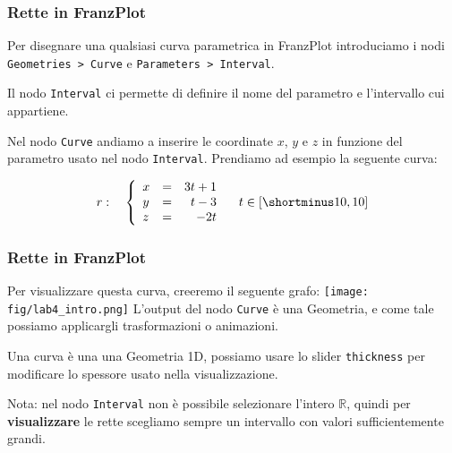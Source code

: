 \documentclass{beamer}
\newcommand{\fig}{./figures} %
\newcommand{\frnzplt}{FranzPlot }
\begin{document}
\begin{frame}
    \frametitle{Rette in \frnzplt}
    Per disegnare una qualsiasi curva parametrica in \frnzplt introduciamo i nodi \texttt{Geometries > Curve} e \texttt{Parameters > Interval}.

    \vspace{0.25cm}
    Il nodo \texttt{Interval} ci permette di definire il nome del parametro e l'intervallo cui appartiene.

    \vspace{0.25cm}
    Nel nodo \texttt{Curve} andiamo a inserire le coordinate $x$, $y$ e $z$ in funzione del parametro usato nel nodo \texttt{Interval}. Prendiamo ad esempio
    la seguente curva:

$$
r: \quad \left\{
\begin{array}{lcr}
x&=&3t+1\\
y&=&t-3\\
z&=&-2t
\end{array}
\right.
    \quad t\in \left[ \shortminus 10, 10 \right]
$$
    \end{frame}
    
\begin{frame}
    \frametitle{Rette in \frnzplt}
    Per visualizzare questa curva, creeremo il seguente grafo:
\texttt{[image: \\fig/lab4\_intro.png]}
    L'output del nodo \texttt{Curve} \`e una Geometria, e come tale possiamo applicargli trasformazioni o animazioni.

    Una curva \`e una una Geometria 1D, possiamo usare lo slider \texttt{thickness} per modificare lo spessore usato nella visualizzazione.

    \vspace{0.5cm}
    Nota: nel nodo \texttt{Interval} non \`e possibile selezionare l'intero $\mathbb R$, quindi per \textbf{visualizzare} le rette scegliamo sempre un intervallo
    con valori sufficientemente grandi.

    \end{frame}
\end{document}
